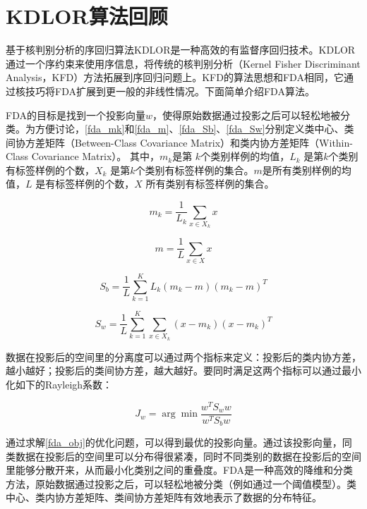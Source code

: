 \section{KDLOR算法回顾}
基于核判别分析的序回归算法KDLOR\citep{sun2010kernel}是一种高效的有监督序回归技术。KDLOR通过一个序约束来使用序信息，将传统的核判别分析（Kernel Fisher Discriminant Analysis，KFD）方法拓展到序回归问题上。KFD的算法思想和FDA相同，它通过核技巧将FDA扩展到更一般的非线性情况。下面简单介绍FDA算法。

FDA的目标是找到一个投影向量\(w\)，使得原始数据通过投影之后可以轻松地被分类。为方便讨论，\autoref{fda_mk}和\autoref{fda_m}、\autoref{fda_Sb}、\autoref{fda_Sw}分别定义类中心、类间协方差矩阵（Between-Class Covariance Matrix）和类内协方差矩阵（Within-Class Covariance Matrix）。 其中，\(m_{k}\)是第 \(k\)个类别样例的均值，\(L_{k}\) 是第\(k\)个类别有标签样例的个数，\(X_{k}\) 是第\(k\)个类别有标签样例的集合。\(m\)是所有类别样例的均值，\(L\) 是有标签样例的个数，\(X\) 所有类别有标签样例的集合。

\begin{equation}
\label{fda_mk}
m_{k}=\frac{1}{L_{k}}\sum_{x\in X_{k}}x
\end{equation}

\begin{equation}
\label{fda_m}
m =\frac{1}{L}\sum_{x \in X} x
\end{equation}

\begin{equation}
\label{fda_Sb}
S_{b} = \frac{1}{L}\sum_{k=1}^{K} L_{k} (m_{k} - m)(m_{k} - m)^{T}
\end{equation}

\begin{equation}
\label{fda_Sw}
S_{w} = \frac{1}{L}\sum_{k=1}^{K}\sum_{x\in X_{k}}(x-m_{k})(x-m_{k})^{T}
\end{equation}

数据在投影后的空间里的分离度可以通过两个指标来定义：投影后的类内协方差，越小越好；投影后的类间协方差，越大越好。要同时满足这两个指标可以通过最小化如下的Rayleigh系数：

\begin{equation}
\label{fda_obj}
J_{w} = \arg \min{\frac{w^{T} S_{w} w}{w^{T} S_{b} w} }
\end{equation}

通过求解\autoref{fda_obj}的优化问题，可以得到最优的投影向量。通过该投影向量，同类数据在投影后的空间里可以分布得很紧凑，同时不同类别的数据在投影后的空间里能够分散开来，从而最小化类别之间的重叠度。FDA是一种高效的降维和分类方法，原始数据通过投影之后，可以轻松地被分类（例如通过一个阈值模型）。类中心、类内协方差矩阵、类间协方差矩阵有效地表示了数据的分布特征。

